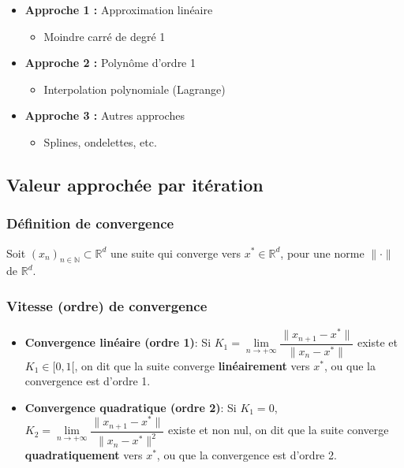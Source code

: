\documentclass[oneside]{book}
\begin{document}
\begin{itemize}
    \item \textbf{Approche 1 :} Approximation linéaire
    \begin{itemize}
        \item Moindre carré de degré 1
    \end{itemize}
    \item \textbf{Approche 2 :} Polynôme d'ordre 1
    \begin{itemize}
        \item Interpolation polynomiale (Lagrange)
    \end{itemize}
    \item \textbf{Approche 3 :} Autres approches
    \begin{itemize}
        \item Splines, ondelettes, etc.
    \end{itemize}
\end{itemize}


\subsection{Valeur approchée par itération}

\subsubsection{Définition de convergence}
\begin{definition}
Soit $(x_n)_{n \in \mathbb{N}} \subset \mathbb{R}^d$ une suite qui converge vers $x^* \in \mathbb{R}^d$, pour une norme $\|\cdot\|$ de $\mathbb{R}^d$.
\end{definition}

\subsubsection{Vitesse (ordre) de convergence}

\begin{itemize}
    \item \textbf{Convergence linéaire (ordre 1)}: Si $K_1 = \lim\limits_{n \to +\infty} \dfrac{\|x_{n+1}-x^*\|}{\|x_n-x^*\|}$ existe et $K_1 \in [0, 1[$, on dit que la suite converge \textbf{linéairement} vers $x^*$, ou que la convergence est d'ordre 1.
\end{itemize}

\begin{itemize}
    \item \textbf{Convergence quadratique (ordre 2)}: Si $K_1 = 0$, $K_2 = \lim\limits_{n \to +\infty} \dfrac{\|x_{n+1}-x^*\|}{\|x_n-x^*\|^2}$ existe et non nul, on dit que la suite converge \textbf{quadratiquement} vers $x^*$, ou que la convergence est d'ordre 2.
\end{itemize}
\end{document}

